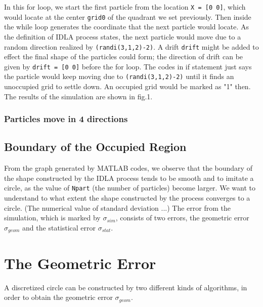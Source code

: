 \documentclass[letterpaper]{article}
\numberwithin{equation}{section} %
\numberwithin{figure}{section} %
\numberwithin{table}{section} %
\begin{document}
In this for loop, we start the first particle from the location \texttt{X = [0 0]}, which would locate at the center \texttt{grid0} of the quadrant we set previously. Then inside the while loop generates the coordinate that the next particle would locate. As the definition of IDLA process states, the next particle would move due to a random direction realized by \texttt{(randi(3,1,2)-2)}. A drift \texttt{drift} might be added to effect the final shape of the particles could form; the direction of drift can be given by \texttt{drift = [0 0]} before the for loop. The codes in if statement just says the particle would keep moving due to \texttt{(randi(3,1,2)-2)} until it finds an unoccupied grid to settle down. An occupied grid would be marked as "1" then. The results of the simulation are shown in fig.1. 






\subsubsection{Particles move in 4 directions}

\subsection{Boundary of the Occupied Region}
From the graph generated by MATLAB codes, we observe that the boundary of the shape constructed by the IDLA process tends to be smooth and to imitate a circle, as the value of \texttt{Npart} (the number of particles) become larger. We want to understand to what extent the shape constructed by the process converges to a circle. (The numerical value of standard deviation ...) The error from the simulation, which is marked by $\sigma_{sim}$, consists of two errors, the geometric error $\sigma_{geom}$ and the statistical error $\sigma_{stat}$. 	

\section{The Geometric Error}

A discretized circle can be constructed by two different kinds of algorithms, in order to obtain the geometric error $\sigma_{geom}$. 
\end{document}

